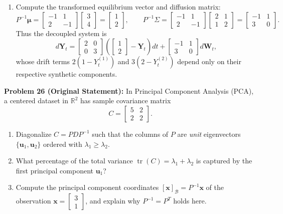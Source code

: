 \documentclass[11pt, letterpaper]{article}
\theoremstyle{definition}
\theoremstyle{remark}
\begin{document}
\begin{enumerate}[label=(\alph*)]
    \item Compute the transformed equilibrium vector and diffusion matrix:
    \[
    P^{-1}\boldsymbol{\mu} = \begin{bmatrix} -1 & 1 \\ 2 & -1 \end{bmatrix}\begin{bmatrix} 3 \\ 4 \end{bmatrix} = \begin{bmatrix} 1 \\ 2 \end{bmatrix}, \qquad P^{-1}\Sigma = \begin{bmatrix} -1 & 1 \\ 2 & -1 \end{bmatrix}\begin{bmatrix} 2 & 1 \\ 1 & 2 \end{bmatrix} = \begin{bmatrix} -1 & 1 \\ 3 & 0 \end{bmatrix}.
    \]
    Thus the decoupled system is
    \[
    d\mathbf{Y}_{t} = \begin{bmatrix} 2 & 0 \\ 0 & 3 \end{bmatrix}\left(\begin{bmatrix} 1 \\ 2 \end{bmatrix} - \mathbf{Y}_{t}\right)dt + \begin{bmatrix} -1 & 1 \\ 3 & 0 \end{bmatrix}d\mathbf{W}_{t},
    \]
    whose drift terms $2(1 - Y_{t}^{(1)})$ and $3(2 - Y_{t}^{(2)})$ depend only on their respective synthetic components.
\end{enumerate}

\vspace{0.8em}
\textbf{Problem 26 (Original Statement):}
In Principal Component Analysis (PCA), a centered dataset in $\mathbb{R}^{2}$ has sample covariance matrix
\[
C = \begin{bmatrix} 5 & 2 \\ 2 & 2 \end{bmatrix}.
\]
\begin{enumerate}[label=(\alph*)]
    \item Diagonalize $C = PDP^{-1}$ such that the columns of $P$ are \emph{unit} eigenvectors $\{\mathbf{u}_{1}, \mathbf{u}_{2}\}$ ordered with $\lambda_{1} \ge \lambda_{2}$.
    \item What percentage of the total variance $\operatorname{tr}(C) = \lambda_{1} + \lambda_{2}$ is captured by the first principal component $\mathbf{u}_{1}$?
    \item Compute the principal component coordinates $[\mathbf{x}]_{\mathcal{B}} = P^{-1}\mathbf{x}$ of the observation $\mathbf{x} = \begin{bmatrix} 3 \\ 1 \end{bmatrix}$, and explain why $P^{-1} = P^{T}$ holds here.
\end{enumerate}
\end{document}
